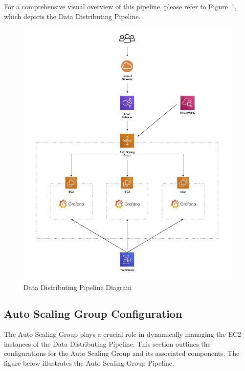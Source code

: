 \documentclass[12pt,oneside]{book} %
\begin{document}
For a comprehensive visual overview of this pipeline, please refer to
Figure~\ref{fig:data-distributing-pipeline}, which depicts the Data
Distributing Pipeline.

\begin{figure}[H]
    \centering
    \includegraphics[width=1\linewidth]{images/cloud-computing-clients.png}
    \caption{Data Distributing Pipeline Diagram}\label{fig:data-distributing-pipeline}
\end{figure}

\newpage
\subsection{Auto Scaling Group Configuration}

The Auto Scaling Group plays a crucial role in dynamically managing the EC2
instances of the Data Distributing Pipeline. This section outlines the
configurations for the Auto Scaling Group and its associated components. The
figure below\cite{fig:auto-scaling-group-pipeline} illustrates the Auto Scaling
Group Pipeline.
\end{document}
